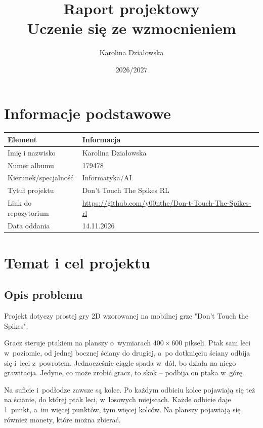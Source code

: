 \documentclass[12pt]{article}
\title{Raport projektowy\\Uczenie się ze wzmocnieniem}
\author{Karolina Działowska\\}
\date{2026/2027}
\begin{document}
\maketitle
\tableofcontents
\newpage

\section{Informacje podstawowe}

\begin{center}
\begin{tabular}{p{}p{}}
\toprule
Element & Informacja \\
\midrule
Imię i nazwisko & Karolina Działowska\\
Numer albumu & 179478 \\
Kierunek/specjalność & Informatyka/AI \\
Tytuł projektu & Don't Touch The Spikes RL \\
Link do repozytorium & \url{https://github.com/y00nthe/Don-t-Touch-The-Spikes-rl} \\
Data oddania & 14.11.2026 \\
\bottomrule
\end{tabular}
\end{center}

\section{Temat i cel projektu}

\subsection{Opis problemu}

Projekt dotyczy prostej gry 2D wzorowanej na mobilnej grze "Don't Touch the Spikes".

Gracz steruje ptakiem na planszy o~wymiarach $400 \times 600$ pikseli.
Ptak sam leci w~poziomie, od jednej bocznej ściany do drugiej, a~po
dotknięciu ściany odbija się i~leci z~powrotem. Jednocześnie ciągle
spada w~dół, bo działa na niego grawitacja. Jedyne, co może zrobić
gracz, to skok -- podbija on ptaka w~górę.

Na suficie i~podłodze zawsze są kolce. Po każdym odbiciu kolce pojawiają
się też na ścianie, do której ptak leci, w~losowych miejscach. Każde
odbicie daje 1~punkt, a~im więcej punktów, tym więcej kolców. Na planszy
pojawiają się również monety, które można zbierać.
\end{document}
